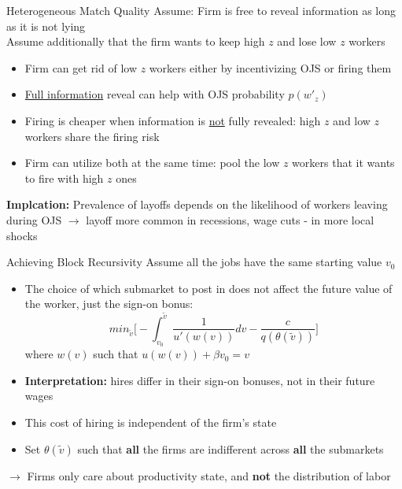 \documentclass[9pt,aspectratio=169]{beamer} %
\begin{document}
\begin{frame}[noframenumbering]{Heterogeneous Match Quality}
Assume: Firm is free to reveal information as long as it is not lying
\\
Assume additionally that the firm wants to keep high $z$ and lose low $z$ workers
\vspace{0.5cm}
\begin{itemize}
    \item Firm can get rid of low $z$ workers either by incentivizing OJS or firing them
    \vspace{5pt}
    \item \underline{Full information} reveal can help with OJS probability $p(w'_z)$
    \vspace{5pt}
    \item Firing is cheaper when information is \underline{not} fully revealed: high $z$ and low $z$ workers share the firing risk
    \vspace{5pt}
    \item Firm can utilize both at the same time: pool the low $z$ workers that it wants to fire with high $z$ ones
\end{itemize}
\vspace{0.5cm}
\textbf{Implcation:} Prevalence of layoffs depends on the likelihood of workers leaving during OJS $\rightarrow$ layoff more common in recessions, wage cuts - in more local shocks
\hyperlink{HMQ}{} %
\end{frame}

\begin{frame}[noframenumbering]{Achieving Block Recursivity}
\hypertarget{Block Recur}{}
Assume all the jobs have the same starting value $v_0$
\begin{itemize}
    \item The choice of which submarket to post in does not affect the future value of the worker, just the sign-on bonus:
    \[min_{\tilde{v}}\Big[-\int_{v_0}^{\tilde{v}}\frac{1}{u'(w(v))}dv -\frac{c}{q(\theta(\tilde{v}))}\Big]\]
    where $w(v)$ such that $u(w(v))+\beta v_0=v$
    \item \textbf{Interpretation:} hires differ in their sign-on bonuses, not in their future wages
    \item This cost of hiring is independent of the firm's state
    \item Set $\theta(\tilde{v})$ such that \textbf{all} the firms are indifferent across \textbf{all} the submarkets
\end{itemize}
\vspace{5pt}
$\rightarrow$ Firms only care about productivity state, and \textbf{not} the distribution of labor
\hyperlink{PE}{} 

\end{frame}
\end{document}

